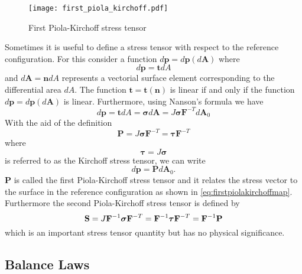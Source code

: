 \begin{figure}[htpb]
    \centering
    \texttt{[image: first\_piola\_kirchoff.pdf]}
    \caption{First Piola-Kirchoff stress tensor}%
    \label{fig:first_piola_kirchoff_stress}
\end{figure}
Sometimes it is useful to define a stress tensor with respect to the reference configuration. For this consider a function \(d\bm{p}=d\bm{p}(d\bm{A})\) where
\begin{equation}
    d\bm{p} = \bm{t}dA
\end{equation}
and \(d\bm{A}=\bm{n}dA\) represents a vectorial surface element corresponding to the differential area \(dA\). The function \(\bm{t} = \bm{t}(\bm{n})\) is linear if and only if the function \(d\bm{p}=d\bm{p}(d\bm{A})\) is linear. Furthermore, using Nanson's formula we have
\begin{equation}
    d\bm{p} = \bm{t}dA = \bm{\sigma}d\bm{A} = J\bm{\sigma}\mathbf{F}^{-T}d\bm{A}_{0}
\end{equation}
With the aid of the definition
\begin{equation}
    \mathbf{P}=J\bm{\sigma}\mathbf{F}^{-T} = \bm{\tau}\mathbf{F}^{-T}
    \label{eq:def_firstpiolakirchoffstress}
\end{equation}
where 
\begin{equation}
    \bm{\tau} = J\bm{\sigma}
    \label{eq:kirchoff_stress}
\end{equation}
is referred to as the Kirchoff stress tensor, we can write
\begin{equation}
    d\bm{p} = \mathbf{P}d\bm{A}_{0}.
    \label{eq:firstpiolakirchoffmap}
\end{equation}
\(\mathbf{P}\) is called the first Piola-Kirchoff stress tensor and it relates the stress vector to the surface in the reference configuration as shown in \cref{eq:firstpiolakirchoffmap}. 
Furthermore the second Piola-Kirchoff stress tensor is defined by 
\begin{equation}
    \mathbf{S}  = J\mathbf{F}^{-1}\bm{\sigma}\mathbf{F}^{-T}
    =\mathbf{F}^{-1} \bm{\tau} \mathbf{F}^{-T}
     = \mathbf{F}^{-1}\mathbf{P}
    \label{eq:secondpiolakirchoff_stress}
\end{equation}
which is an important stress tensor quantity but has no physical significance.

\subsection{Balance Laws}
